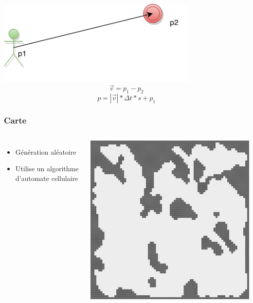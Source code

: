 \documentclass{beamer}
\begin{document}
\begin{frame}
\begin{center}
\includegraphics[width=0.75\textwidth]{img/pres_depl.png}\\
$$\vec{v}=p_1-p_2$$
$$p=|\vec{v}|*\Delta t*s+p_1$$
\end{center}
\end{frame}

\begin{frame}
\frametitle{Carte}
\begin{columns}
\begin{itemize}
	\item Génération aléatoire
	\item Utilise un algorithme d'automate cellulaire
\end{itemize}
\begin{center}
\includegraphics[width=1\textwidth]{img/map_example.png}\\
\end{center}
\end{columns}
\end{frame}
\end{document}
